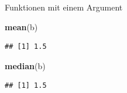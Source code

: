 \documentclass[ignorenonframetext,]{beamer}
\newenvironment{Shaded}{\begin{snugshade}}{\end{snugshade}}
\newcommand{\KeywordTok}[1]{\textcolor[rgb]{0.13,0.29,0.53}{\textbf{#1}}}
\newcommand{\NormalTok}[1]{#1}
\begin{document}
\begin{frame}[fragile]{Funktionen mit einem Argument}
\protect\hypertarget{funktionen-mit-einem-argument}{}

\begin{Shaded}
\begin{Highlighting}[]
\KeywordTok{mean}\NormalTok{(b)}
\end{Highlighting}
\end{Shaded}

\begin{verbatim}
## [1] 1.5
\end{verbatim}

\begin{Shaded}
\begin{Highlighting}[]
\KeywordTok{median}\NormalTok{(b)}
\end{Highlighting}
\end{Shaded}

\begin{verbatim}
## [1] 1.5
\end{verbatim}

\end{frame}
\end{document}
